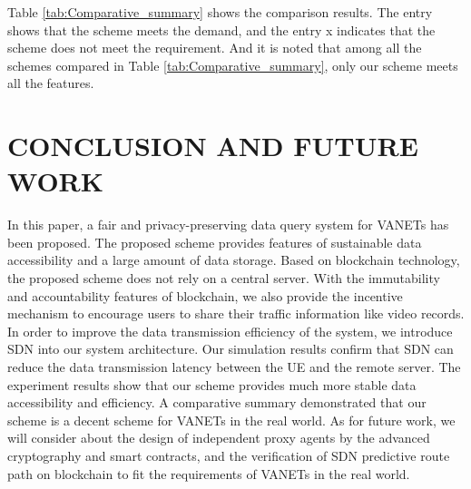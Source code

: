 \documentclass[journal,10pt]{IEEEtran}
\begin{document}
Table \ref{tab:Comparative_summary} shows the comparison results. The entry \checkmark shows that the scheme meets the demand, and the entry x indicates that the scheme does not meet the requirement. And it is noted that among all the schemes compared in Table \ref{tab:Comparative_summary}, only our scheme meets all the features. 


\section{CONCLUSION AND FUTURE WORK}
In this paper, a fair and privacy-preserving data query system for VANETs has been proposed. The proposed scheme provides features of sustainable data accessibility and a large amount of data storage. Based on blockchain technology, the proposed scheme does not rely on a central server. With the immutability and accountability features of blockchain, we also provide the incentive mechanism to encourage users to share their traffic information like video records. In order to improve the data transmission efficiency of the system, we introduce SDN into our system architecture. Our simulation results confirm that SDN can reduce the data transmission latency between the UE and the remote server. The experiment results show that our scheme provides much more stable data accessibility and efficiency. A comparative summary demonstrated that our scheme is a decent scheme for VANETs in the real world. As for future work, we will consider about the design of independent proxy agents by the advanced cryptography and smart contracts, and the verification of SDN predictive route path on blockchain to fit the requirements of VANETs in the real world.







\end{document}
